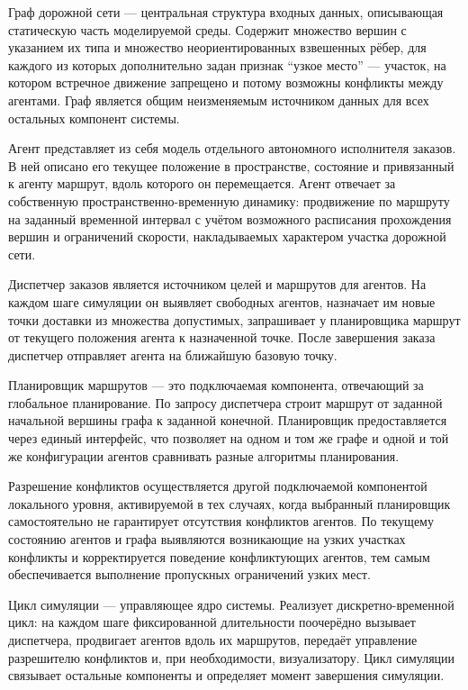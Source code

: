 Граф дорожной сети --- центральная структура входных данных, описывающая статическую часть 
моделируемой среды. Содержит множество вершин с указанием их типа и множество неориентированных 
взвешенных рёбер, для каждого из которых дополнительно задан признак \enquote{узкое место} --- 
участок, на котором встречное движение запрещено и потому возможны конфликты между агентами. 
Граф является общим неизменяемым источником данных для всех остальных компонент системы.

Агент представляет из себя модель отдельного автономного исполнителя заказов. В ней описано его 
текущее положение в пространстве, состояние 
и привязанный к агенту маршрут, вдоль которого он перемещается. Агент отвечает за собственную 
пространственно-временную динамику: продвижение по маршруту на заданный временной интервал 
с учётом возможного расписания прохождения вершин и ограничений скорости, накладываемых характером 
участка дорожной сети.

Диспетчер заказов является источником целей и маршрутов для агентов. На каждом шаге симуляции он
выявляет свободных агентов, назначает им новые точки доставки из множества допустимых, 
запрашивает у планировщика маршрут от текущего положения агента к назначенной точке. 
После завершения заказа диспетчер отправляет агента на ближайшую базовую точку.

Планировщик маршрутов --- это подключаемая компонента, отвечающий за глобальное планирование. 
По запросу диспетчера строит маршрут от заданной начальной вершины графа к заданной конечной. 
Планировщик предоставляется через единый интерфейс, что позволяет на одном и том же графе и одной и 
той же конфигурации агентов сравнивать разные алгоритмы планирования.

Разрешение конфликтов осуществляется другой подключаемой компонентой локального уровня, активируемой 
в тех случаях, когда выбранный планировщик самостоятельно не гарантирует отсутствия конфликтов агентов.
По текущему состоянию агентов и графа выявляются возникающие на узких участках 
конфликты и корректируется поведение конфликтующих агентов, тем самым обеспечивается выполнение пропускных ограничений 
узких мест.

Цикл симуляции --- управляющее ядро системы. Реализует дискретно-временной цикл: на каждом шаге 
фиксированной длительности поочерёдно вызывает диспетчера, продвигает агентов вдоль их маршрутов, 
передаёт управление разрешителю конфликтов и, при необходимости, визуализатору. Цикл симуляции 
связывает остальные компоненты и определяет момент завершения симуляции.

